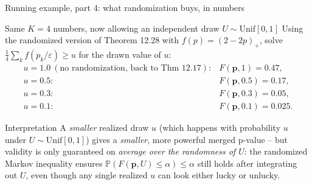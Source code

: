 \documentclass[aspectratio=169,10pt]{beamer}
\newcommand{\PP}{\mathbb{P}}
\newcommand{\bp}{\mathbf{p}}
\begin{document}
\begin{frame}{Running example, part 4: what randomization buys, in numbers}
  \begin{block}{Same $K=4$ numbers, now allowing an independent draw $U\sim\mathrm{Unif}[0,1]$}
    Using the randomized version of Theorem 12.28 with $f(p)=(2-2p)_+$, solve $\tfrac14\sum_kf(p_k/\varepsilon)\ge u$ for the drawn value of $u$:
    \[
      \begin{array}{ll}
        u=1.0\ (\text{no randomization, back to Thm 12.17}): & F(\bp,1)=0.47,\\[2pt]
        u=0.5: & F(\bp,0.5)=0.17,\\[2pt]
        u=0.3: & F(\bp,0.3)=0.05,\\[2pt]
        u=0.1: & F(\bp,0.1)=0.025.
      \end{array}
    \]
  \end{block}
  \begin{block}{Interpretation}
    A \emph{smaller} realized draw $u$ (which happens with probability $u$ under $U\sim\mathrm{Unif}[0,1]$) gives a \emph{smaller}, more powerful merged p-value -- but validity is only guaranteed on \emph{average over the randomness of $U$}: the randomized Markov inequality ensures $\PP(F(\bp,U)\le\alpha)\le\alpha$ still holds after integrating out $U$, even though any single realized $u$ can look either lucky or unlucky.
  \end{block}
\end{frame}
\end{document}
